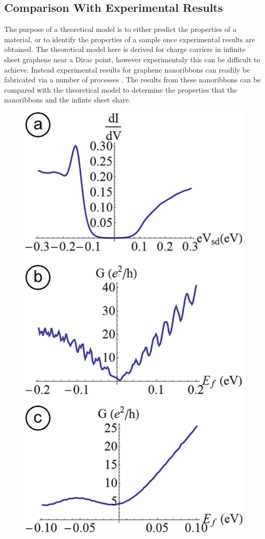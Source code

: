\documentclass[prl,twocolumn,aps,superscriptaddress,floatfix,10pt]{revtex4}
\begin{document}
\subsection{Comparison With Experimental Results}
	The purpose of a theoretical model is to either predict the properties of a material, or to identify the properties of a sample once experimental results are obtained. The theoretical model here is derived for charge carriers in infinite sheet graphene near a Dirac point, however experimentaly this can be difficult to achieve. Instead experimental results for graphene nanoribbons can readily be fabricated via a number of processes \cite{b11, b12,b13,b14}. The results from these nanoribbons can be compared with the theoretical model to determine the properties that the nanoribbons and the infinte sheet share. 
\begin{figure}
	\includegraphics[scale=0.2]{exp-a-flat}

\end{figure}
\end{document}
